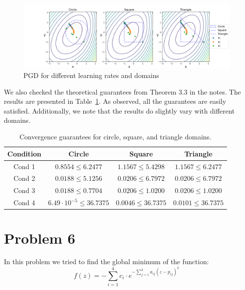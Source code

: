 \documentclass[9pt]{IEEEtran}
\begin{document}
    \begin{figure}[h]
        \centering
        \includegraphics[width=0.99\columnwidth]{figures/PGD.png}
        \caption{PGD for different learning rates and domains}
        \label{fig:PGD}
    \end{figure}

We also checked the theoretical guarantees from Theorem 3.3 in the notes. The results are presented in Table~\ref{tab:guarantees}. As observed, all the guarantees are easily satisfied. Additionally, we note that the results do slightly vary with different domains.


\begin{table}[H]
    \centering
    \begin{tabular}{c|c|c|c}
    \textbf{Condition} & \textbf{Circle} & \textbf{Square} & \textbf{Triangle} \\
    \hline
    Cond 1 & $0.8554 \leq 6.2477$ & $1.1567 \leq 5.4298$ & $1.1567 \leq 6.2477$ \\
    Cond 2 & $0.0188 \leq 5.1256$ & $0.0206 \leq 6.7972$ & $0.0206 \leq 6.7972$ \\
    Cond 3 & $0.0188 \leq 0.7704$ & $0.0206 \leq 1.0200$ & $0.0206 \leq 1.0200$ \\
    Cond 4 & $6.49\cdot10^{-5} \leq 36.7375$ & $0.0046 \leq 36.7375$ & $0.0101 \leq 36.7375$ \\
    \end{tabular}
    \caption{Convergence guarantees for circle, square, and triangle domains.}
    \label{tab:guarantees}
    \end{table}
    
\section{Problem 6}
In this problem we tried to find the global minimum of the function:
\begin{equation}
    f(z) = - \sum_{i=1}^{4} c_i \cdot e^{-\sum_{j=1}^{3} a_{ij} (z - p_{ij})^2}
    \end{equation}
    
\end{document}
